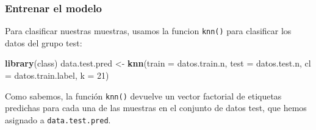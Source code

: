 \documentclass[
]{article}
\newenvironment{Shaded}{\begin{snugshade}}{\end{snugshade}}
\newcommand{\CommentTok}[1]{\textcolor[rgb]{0.56,0.35,0.01}{\textit{#1}}}
\newcommand{\DataTypeTok}[1]{\textcolor[rgb]{0.13,0.29,0.53}{#1}}
\newcommand{\DecValTok}[1]{\textcolor[rgb]{0.00,0.00,0.81}{#1}}
\newcommand{\KeywordTok}[1]{\textcolor[rgb]{0.13,0.29,0.53}{\textbf{#1}}}
\newcommand{\NormalTok}[1]{#1}
\newcommand{\OperatorTok}[1]{\textcolor[rgb]{0.81,0.36,0.00}{\textbf{#1}}}
\newcommand{\StringTok}[1]{\textcolor[rgb]{0.31,0.60,0.02}{#1}}
\begin{document}
\begin{Shaded}
\end{Shaded}

\hypertarget{entrenar-el-modelo}{%
\subsubsection{Entrenar el modelo}\label{entrenar-el-modelo}}

Para clasificar nuestras muestras, usamos la funcion \texttt{knn()} para
clasificar los datos del grupo test:

\begin{Shaded}
\begin{Highlighting}[]
\KeywordTok{library}\NormalTok{(class)}
\NormalTok{data.test.pred <-}\StringTok{ }\KeywordTok{knn}\NormalTok{(}\DataTypeTok{train =}\NormalTok{ datos.train.n, }\DataTypeTok{test =}\NormalTok{ datos.test.n,}
                      \DataTypeTok{cl =}\NormalTok{ datos.train.label, }\DataTypeTok{k =} \DecValTok{21}\NormalTok{)}
\end{Highlighting}
\end{Shaded}

Como sabemos, la función \texttt{knn()} devuelve un vector factorial de
etiquetas predichas para cada una de las muestras en el conjunto de
datos test, que hemos asignado a \texttt{data.test.pred}.
\end{document}
